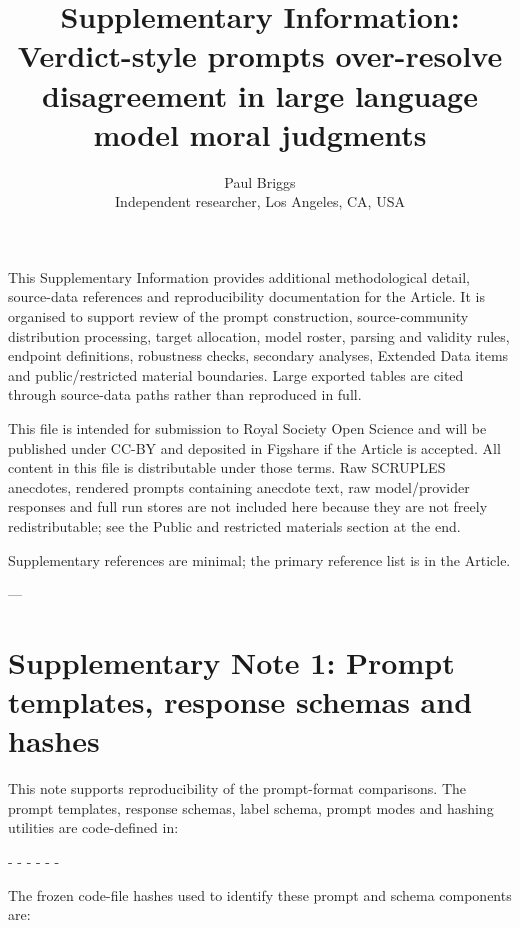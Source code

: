 \documentclass[11pt]{article}
\title{Supplementary Information: Verdict-style prompts over-resolve disagreement in large language model moral judgments}
\author{Paul Briggs\\Independent researcher, Los Angeles, CA, USA}
\date{}
\begin{document}
\maketitle
\linenumbers
This Supplementary Information provides additional methodological detail, source-data references and reproducibility documentation for the Article. It is organised to support review of the prompt construction, source-community distribution processing, target allocation, model roster, parsing and validity rules, endpoint definitions, robustness checks, secondary analyses, Extended Data items and public/restricted material boundaries. Large exported tables are cited through source-data paths rather than reproduced in full.

This file is intended for submission to Royal Society Open Science and will be published under CC-BY and deposited in Figshare if the Article is accepted. All content in this file is distributable under those terms. Raw SCRUPLES anecdotes, rendered prompts containing anecdote text, raw model/provider responses and full run stores are not included here because they are not freely redistributable; see the Public and restricted materials section at the end.

Supplementary references are minimal; the primary reference list is in the Article.

---

\section{Supplementary Note 1: Prompt templates, response schemas and hashes}

This note supports reproducibility of the prompt-format comparisons. The prompt templates, response schemas, label schema, prompt modes and hashing utilities are code-defined in:

- 
- 
- 
- 
- 
- 

The frozen code-file hashes used to identify these prompt and schema components are:
\end{document}
